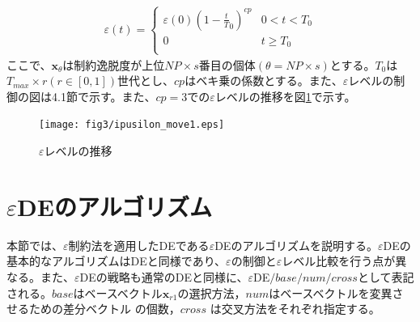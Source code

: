 \documentclass[a4paper,12pt]{jsreport}
\begin{document}
\begin{eqnarray}
\varepsilon(t)=
\left\{
\begin{array}{cc}
    {\varepsilon}(0){(1-\frac{t}{T}_0)}^{cp} & \mbox{$0<t<{T}_0$} \\
    {0} & \mbox{$t\geq{T}_0$}\\
\end{array}
\right.
\label{fig:εレベル制御の式}
\end{eqnarray}
ここで、${\bm x}_\theta$は制約逸脱度が上位$NP\times s$番目の個体$(\theta=NP\times s)$とする。${T}_0$は${T}_{max} × r(r\in [0,1])$世代とし、$cp$はベキ乗の係数とする。また、$\varepsilon$レベルの制御の図は4.1節で示す。また、$cp=3$での$\varepsilon$レベルの推移を図\ref{fig:εレベルの動き1}で示す。

\begin{figure}[htbp]
  \centering
  \texttt{[image: fig3/ipusilon\_move1.eps]}
  \caption{$\varepsilon$レベルの推移}
  \label{fig:εレベルの動き1}
\end{figure}

\section{$\varepsilon$DEのアルゴリズム}
本節では、$\varepsilon$制約法を適用したDEである$\varepsilon$DEのアルゴリズムを説明する。$\varepsilon$DEの基本的なアルゴリズムはDEと同様であり、$\varepsilon$の制御と$\varepsilon$レベル比較を行う点が異なる。また、$\varepsilon$DEの戦略も通常のDEと同様に、$\varepsilon$DE$/base/num/cross$として表記される。$base$はベースベクトル$\bm{x}_{r1}$の選択方法，$num$はベースベクトルを変異させるための差分ベクトル
の個数，$cross$ は交叉方法をそれぞれ指定する。
\end{document}
